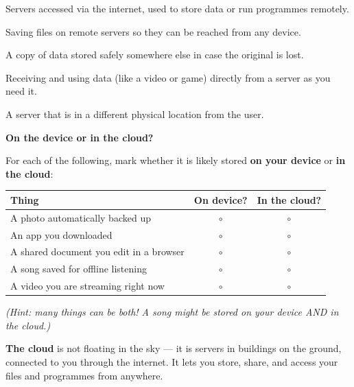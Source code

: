 \sectionrule

\begin{newwords}
  \begin{description}[labelwidth=3.5cm, leftmargin=3.7cm]
    \item[\term{The cloud}]       Servers accessed via the internet, used to store data or run programmes remotely.
    \item[\term{Cloud storage}]   Saving files on remote servers so they can be reached from any device.
    \item[\term{Backup}]          A copy of data stored safely somewhere else in case the original is lost.
    \item[\term{Streaming}]       Receiving and using data (like a video or game) directly from a server as you need it.
    \item[\term{Remote server}]   A server that is in a different physical location from the user.
  \end{description}
\end{newwords}

\sectionrule

\begin{tryit}
  \textbf{On the device or in the cloud?}

  For each of the following, mark whether it is likely stored \textbf{on your device}
  or \textbf{in the cloud}:

  \begin{center}
    \begin{tabularx}{\linewidth}{Ycc}
      \textbf{Thing} & \textbf{On device?} & \textbf{In the cloud?} \\
      \hline
      A photo automatically backed up & $\circ$ & $\circ$ \\
      An app you downloaded & $\circ$ & $\circ$ \\
      A shared document you edit in a browser & $\circ$ & $\circ$ \\
      A song saved for offline listening & $\circ$ & $\circ$ \\
      A video you are streaming right now & $\circ$ & $\circ$ \\
    \end{tabularx}
  \end{center}

  \emph{(Hint: many things can be both!  A song might be stored on your device AND in the cloud.)}
\end{tryit}

\sectionrule

\begin{bigidea}
  \textbf{The cloud} is not floating in the sky —
  it is servers in buildings on the ground, connected to you through the internet.
  It lets you store, share, and access your files and programmes from anywhere.
\end{bigidea}

